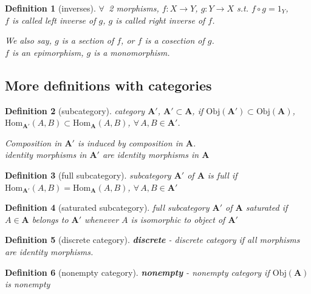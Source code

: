 \documentclass[10pt]{amsart}
\newtheorem{definition}{Definition}
\begin{document}
\begin{multicols*}{2}
\begin{definition}[inverses]
	$\forall \, $ 2 morphisms, $f:X\to Y$, $g: Y \to X$ s.t. $f\circ g= 1_Y$,\\
	$f$ is called left inverse of $g$, $g$ is called right inverse of $f$.
	
	We also say, $g$ is a section of $f$, or $f$ is a cosection of $g$. \\
	$f$ is an epimorphism, $g$ is a monomorphism.
\end{definition}

\subsection{More definitions with categories}

\begin{definition}[subcategory]
category $\mathbf{A}'$, $\mathbf{A}' \subset \mathbf{A}$, if $\text{Obj}(\mathbf{A}') \subset \text{Obj}(\mathbf{A})$, $\text{Hom}_{\mathbf{A}'}(A,B) \subset \text{Hom}_{\mathbf{A}}(A,B)$, $\forall \, A, B \in \mathbf{A}'$.

Composition in $\mathbf{A}'$ is induced by composition in $\mathbf{A}$.\\
identity morphisms in $\mathbf{A}'$ are identity morphisms in $\mathbf{A}$
\end{definition}

\begin{definition}[full subcategory]
	subcategory $\mathbf{A}'$ of $\mathbf{A}$ is full if $\text{Hom}_{\mathbf{A}'}(A,B) = \text{Hom}_{\mathbf{A}}(A,B)$, $\forall \, A, B \in \mathbf{A}'$	
\end{definition}

\begin{definition}[saturated subcategory]
full subcategory $\mathbf{A}'$ of $\mathbf{A}$ saturated if $A \in \mathbf{A}$ belongs to $\mathbf{A}'$ whenever $A$ is isomorphic to object of $\mathbf{A}'$	
\end{definition}

\begin{definition}[discrete category]
	\textbf{discrete} - discrete category if all morphisms are identity morphisms.
\end{definition}

\begin{definition}[nonempty category]
	\textbf{nonempty} - nonempty category if $\text{Obj}(\mathbf{A})$ is nonempty
\end{definition}


\end{multicols*}
\end{document}
